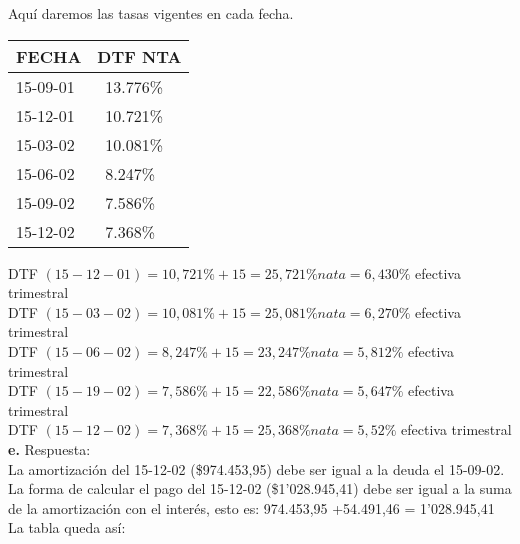 Aquí daremos las tasas vigentes en cada fecha.
\begin{spacing}{1.1}
    \begin{center}
        \begin{tabular}{|p{1.5cm}|p{2.5cm}|}
        \hline 
        \rowcolor{white!50}
            \textbf{FECHA} & \textbf{DTF NTA}  \\ \hline                        

           
            15-09-01 & \ 13.776\% \\ \hline
            15-12-01 & \ 10.721\% \\ \hline
            15-03-02 & \ 10.081\% \\ \hline
            15-06-02 &\ 8.247\% \\ \hline
            15-09-02 & \ 7.586\% \\ \hline
            15-12-02 & \ 7.368\% \\ \hline
\end{tabular}
\end{center}
\end{spacing}

DTF	 $(15-12-01)= 10,721\% + 15= 25,721\% nata = 6,430\%$ 	efectiva trimestral\\
DTF	 $(15-03-02)= 10,081\% + 15= 25,081\% nata = 6,270\%$ 	efectiva trimestral\\
DTF	 $(15-06-02)= 8,247\% + 15= 23,247\% nata = 5,812\% $	efectiva trimestral\\
DTF	 $(15-19-02)= 7,586\% + 15= 22,586\% nata = 5,647\% $	efectiva trimestral\\
DTF	 $(15-12-02)= 7,368\% + 15= 25,368\% nata = 5,52\%$ 	efectiva trimestral\\

\textbf{e.}	Respuesta:\\
La amortización del 15-12-02 (\$974.453,95) debe ser igual a la deuda el 15-09-02.
La forma de calcular el pago del 15-12-02 (\$1'028.945,41) debe ser igual a la suma de la amortización con el interés, esto es: 974.453,95 +54.491,46 = 1'028.945,41 La tabla queda así:


